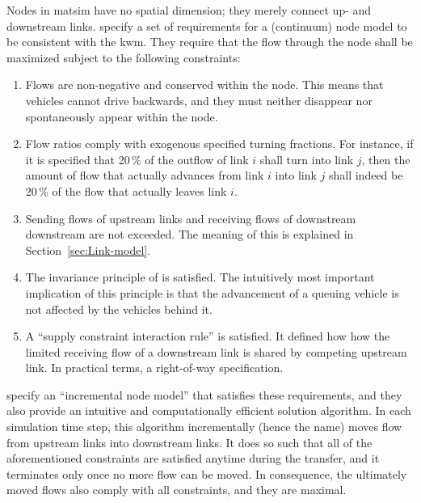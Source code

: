 Nodes in \gls{matsim} have no spatial dimension; they merely connect up-
and downstream links. \citet{tampere-2010b} specify a set of requirements
for a (continuum) node model to be consistent with the \gls{kwm}. They require
that the flow through the node shall be maximized subject to the following
constraints:
\begin{enumerate}
\item Flows are non-negative and conserved within the node. This means that
vehicles cannot drive backwards, and they must neither disappear nor
spontaneously appear within the node.
\item Flow ratios comply with exogenous specified turning fractions. For
instance, if it is specified that 20\,\% of the outflow of link
$i$ shall turn into link $j$, then the amount of flow that actually
advances from link $i$ into link $j$ shall indeed be 20\,\%
of the flow that actually leaves link $i$.
\item Sending flows of upstream links and receiving flows of downstream
downstream are not exceeded. The meaning of this is explained in Section~\ref{sec:Link-model}.
\item The invariance principle of \citet{lebacque-2005} is satisfied. The
intuitively most important implication of this principle is that the
advancement of a queuing vehicle is not affected by the vehicles
behind it.
\item A {}``supply constraint interaction rule'' is satisfied. It defined
how how the limited receiving flow of a downstream link is shared
by competing upstream link. In practical terms, a right-of-way specification.
\end{enumerate}
\citet{floetteroed-2011a} specify an {}``incremental node model''
that satisfies these requirements, and they also provide an intuitive
and computationally efficient solution algorithm. In each simulation
time step, this algorithm incrementally (hence the name) moves flow
from upstream links into downstream links. It does so such that all
of the aforementioned constraints are satisfied anytime during the
transfer, and it terminates only once no more flow can be moved. In
consequence, the ultimately moved flows also comply with all constraints,
and they are maximal. 

